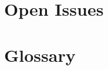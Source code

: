 \documentclass[12pt]{article}
\begin{document}
\clearpage

\section{Open Issues}

\section{Glossary}
\end{document}
